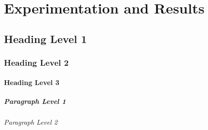 \cleardoublepage
\chapter{Experimentation and Results}
\label{chap:4}

\section{Heading Level 1}

\subsection{Heading Level 2}

\subsubsection{Heading Level 3}

\paragraph{Paragraph Level 1}

\subparagraph{Paragraph Level 2}
